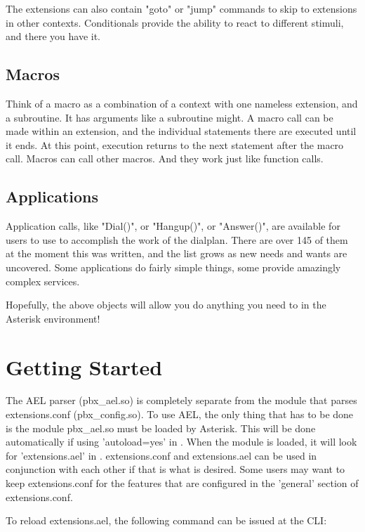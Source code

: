 The extensions can also contain "goto" or "jump" commands to skip to
extensions in other contexts. Conditionals provide the ability to
react to different stimuli, and there you have it.

\subsection{Macros}

Think of a macro as a combination of a context with one nameless
extension, and a subroutine. It has arguments like a subroutine
might. A macro call can be made within an extension, and the
individual statements there are executed until it ends. At this point,
execution returns to the next statement after the macro call. Macros
can call other macros. And they work just like function calls.

\subsection{Applications}

Application calls, like "Dial()", or "Hangup()", or "Answer()", are
available for users to use to accomplish the work of the
dialplan. There are over 145 of them at the moment this was written,
and the list grows as new needs and wants are uncovered. Some
applications do fairly simple things, some provide amazingly complex
services.

Hopefully, the above objects will allow you do anything you need to in
the Asterisk environment!

\section{Getting Started}

The AEL parser (pbx\_ael.so) is completely separate from the module
that parses extensions.conf (pbx\_config.so). To use AEL, the only
thing that has to be done is the module pbx\_ael.so must be loaded by
Asterisk. This will be done automatically if using 'autoload=yes' in
. When the module is loaded, it will look
for 'extensions.ael' in . extensions.conf and
extensions.ael can be used in conjunction with
each other if that is what is desired. Some users may want to keep
extensions.conf for the features that are configured in the 'general'
section of extensions.conf.

To reload extensions.ael, the following command can be issued at the
CLI:

